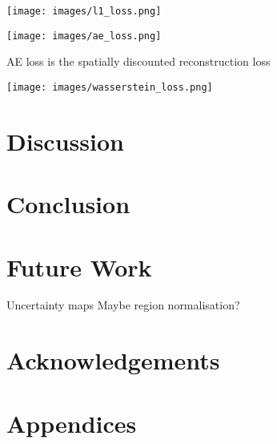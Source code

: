 \documentclass[twocolumn]{article}
\begin{document}
\begin{center}
\texttt{[image: images/l1\_loss.png]}
\end{center}

\begin{center}
\texttt{[image: images/ae\_loss.png]}
\end{center}

AE loss is the spatially discounted reconstruction loss\autocite{zhangVoidFillingBased2020}

\begin{center}
\texttt{[image: images/wasserstein\_loss.png]}
\end{center}


\section{Discussion}
\label{sec:orgf79cfd3}

\section{Conclusion}
\label{sec:org4fa1f8e}

\section{Future Work}
\label{sec:orgdc3898f}

Uncertainty maps
Maybe region normalisation?\autocite{yuRegionNormalizationImage2023}

\section*{Acknowledgements}

\printbibliography

\section*{Appendices}
\end{document}

